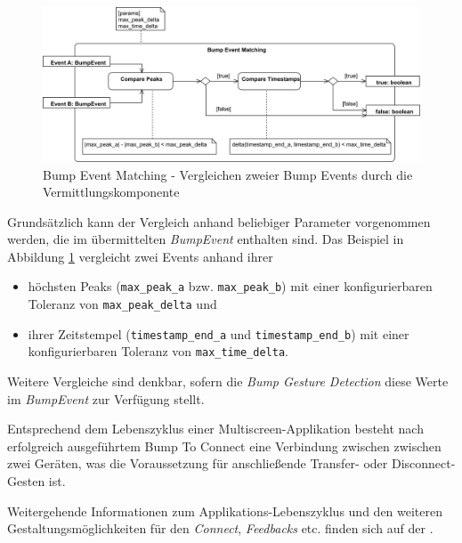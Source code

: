 {\begin{figure}[H]
\includegraphics[width=\textwidth]{bump_event_matching.png}
\caption{Bump Event Matching - Vergleichen zweier Bump Events durch die Vermittlungskomponente}
\label{bump_event_matching}
\end{figure}

Grundsätzlich kann der Vergleich anhand beliebiger Parameter vorgenommen werden, die im übermittelten \textit{BumpEvent} enthalten sind. Das Beispiel in Abbildung \ref{bump_event_matching} vergleicht zwei Events anhand ihrer
\begin{itemize}
\item höchsten Peaks (\texttt{max\_peak\_a} bzw. \texttt{max\_peak\_b}) mit einer konfigurierbaren Toleranz von \texttt{max\_peak\_delta} und
\item ihrer Zeitstempel (\texttt{timestamp\_end\_a} und \texttt{timestamp\_end\_b}) mit einer  konfigurierbaren Toleranz von \texttt{max\_time\_delta}.
\end{itemize} 

Weitere Vergleiche sind denkbar, sofern die \textit{Bump Gesture Detection} diese Werte im \textit{BumpEvent} zur Verfügung stellt.

Entsprechend dem Lebenszyklus einer Multiscreen-Applikation besteht nach erfolgreich
ausgeführtem Bump To Connect eine Verbindung zwischen zwischen zwei Geräten, was die Voraussetzung für anschließende Transfer- oder Disconnect-Gesten ist.

Weitergehende Informationen zum Applikations-Lebenszyklus und den weiteren
Gestaltungsmöglichkeiten für den \textit{Connect}, \textit{Feedbacks} etc. finden sich
auf der \developerpage.
}


\newcommand{\authors}{
Benjamin Grab, Hochschule Mannheim\\
Valentina Burjan, Hochschule Mannheim\\
Dominick Madden, Hochschule Mannheim\\
Horst Schneider, Hochschule Mannheim}

\newcommand{\versionhistory}{07.09.2016}
\newcommand{\dateofcreation}{20.09.2015}
\newcommand{\comments}{...}
\newcommand{\questions}{...}



